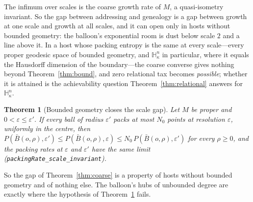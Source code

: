 \documentclass[11pt,reqno]{amsart}
\theoremstyle{plain}
\newtheorem{theorem}{Theorem}[section]
\theoremstyle{definition}
\newcommand{\Hk}{\mathbb{H}^n_\kappa}
\newcommand{\eps}{\varepsilon}
\begin{document}
The infimum over scales is the coarse growth rate of $M$, a quasi-isometry invariant. So the gap between addressing and genealogy is a gap between growth at one scale and growth at all scales, and it can open only in hosts without bounded geometry: the balloon's exponential room is dust below scale $2$ and a line above it. In a host whose packing entropy is the same at every scale---every proper geodesic space of bounded geometry, and $\Hk$ in particular, where it equals the Hausdorff dimension of the boundary---the coarse converse gives nothing beyond Theorem~\ref{thm:bound}, and zero relational tax becomes \emph{possible}; whether it is attained is the achievability question Theorem~\ref{thm:relational} answers for $\Hk$.

\begin{theorem}[Bounded geometry closes the scale gap]\label{thm:scaleinv}
Let $M$ be proper and $0<\eps\le\eps'$. If every ball of radius $\eps'$ packs at most $N_0$ points at resolution $\eps$, uniformly in the centre, then $P(\bar B(o,\rho),\eps')\le P(\bar B(o,\rho),\eps)\le N_0\,P(\bar B(o,\rho),\eps')$ for every $\rho\ge0$, and the packing rates at $\eps$ and $\eps'$ have the same limit (\texttt{packingRate\_scale\_invariant}).
\end{theorem}

So the gap of Theorem~\ref{thm:coarse} is a property of hosts without bounded geometry and of nothing else. The balloon's hubs of unbounded degree are exactly where the hypothesis of Theorem~\ref{thm:scaleinv} fails.
\end{document}

